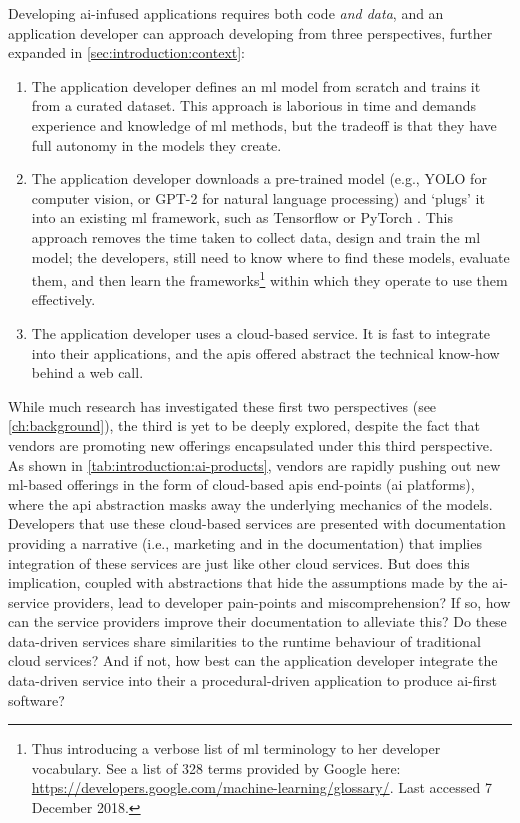 Developing \gls{ai}-infused applications requires both code \textit{and data}, and an application developer can approach developing from three perspectives, further expanded in \cref{sec:introduction:context}:
\begin{enumerate}
  \item The application developer defines an \gls{ml} model from scratch and trains it from a curated dataset. This approach is laborious in time and demands experience and knowledge of \gls{ml} methods, but the tradeoff is that they have full autonomy in the models they create.
  \item The application developer downloads a pre-trained model (e.g., YOLO \citep{8100173} for computer vision, or GPT-2 \citep{Radford2019} for natural language processing) and `plugs' it into an existing \gls{ml} framework, such as Tensorflow \citep{Abadi:2016vn} or PyTorch \citep{NIPS2019_9015}. This approach removes the time taken to collect data, design and train the \gls{ml} model; the developers, still need to know where to find these models, evaluate them, and then learn the frameworks\footnote{Thus introducing a verbose list of \gls{ml} terminology to her developer vocabulary. See a list of 328 terms provided by Google here: \url{https://developers.google.com/machine-learning/glossary/}. Last accessed 7 December 2018.} within which they operate to use them effectively.
  \item The application developer uses a cloud-based service. It is fast to integrate into their applications, and the \glspl{api} offered abstract the technical know-how behind a web call.
\end{enumerate}
While much research has investigated these first two perspectives (see \cref{ch:background}), the third is yet to be deeply explored, despite the fact that vendors are promoting new offerings encapsulated under this third perspective. As shown in \cref{tab:introduction:ai-products}, vendors are rapidly pushing out new \gls{ml}-based offerings in the form of cloud-based \glspl{api} end-points (\gls{ai} platforms), where the \gls{api} abstraction masks away the underlying mechanics of the models. Developers that use these cloud-based services are presented with documentation providing a narrative (i.e., marketing and in the documentation) that implies integration of these services are just like other cloud services. But does this implication, coupled with abstractions that hide the assumptions made by the \gls{ai}-service providers, lead to developer pain-points and miscomprehension?
If so, how can the service providers improve their documentation to alleviate this?
Do these data-driven services share similarities to the runtime behaviour of traditional cloud services?
And if not, how best can the application developer integrate the data-driven service into their a procedural-driven application to produce \gls{ai}-first software?

